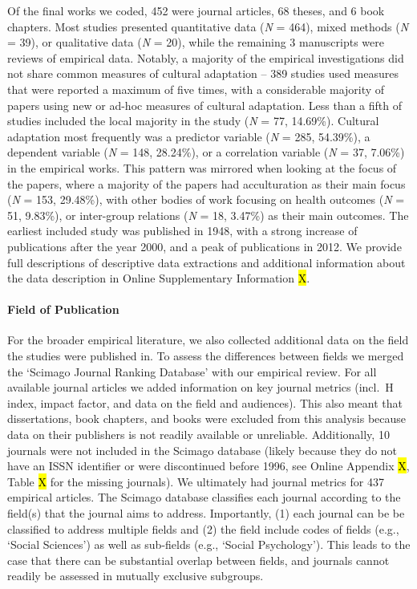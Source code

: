 

Of the final works we coded, 452 were journal articles, 68 theses, and 6
book chapters. Most studies presented quantitative data (\textit{N} =
464), mixed methods (\textit{N} = 39), or qualitative data (\textit{N} =
20), while the remaining 3 manuscripts were reviews of empirical data.
Notably, a majority of the empirical investigations did not share common
measures of cultural adaptation -- 389 studies used measures that were
reported a maximum of five times, with a considerable majority of papers
using new or ad-hoc measures of cultural adaptation. Less than a fifth
of studies included the local majority in the study (\textit{N} = 77,
14.69\%). Cultural adaptation most frequently was a predictor variable
(\textit{N} = 285, 54.39\%), a dependent variable (\textit{N} = 148,
28.24\%), or a correlation variable (\textit{N} = 37, 7.06\%) in the
empirical works. This pattern was mirrored when looking at the focus of
the papers, where a majority of the papers had acculturation as their
main focus (\textit{N} = 153, 29.48\%), with other bodies of work
focusing on health outcomes (\textit{N} = 51, 9.83\%), or inter-group
relations (\textit{N} = 18, 3.47\%) as their main outcomes. The earliest
included study was published in 1948, with a strong increase of
publications after the year 2000, and a peak of publications in 2012. We
provide full descriptions of descriptive data extractions and additional
information about the data description in Online Supplementary
Information \hl{X}.

\paragraph{Field of Publication}

For the broader empirical literature, we also collected additional data
on the field the studies were published in. To assess the differences
between fields we merged the `Scimago Journal Ranking Database'
\citep{SCImago2020} with our empirical review. For all available journal
articles we added information on key journal metrics (incl.~H index,
impact factor, and data on the field and audiences). This also meant
that dissertations, book chapters, and books were excluded from this
analysis because data on their publishers is not readily available or
unreliable. Additionally, 10 journals were not included in the Scimago
database (likely because they do not have an ISSN identifier or were
discontinued before 1996, see Online Appendix \hl{X}, Table \hl{X} for
the missing journals). We ultimately had journal metrics for 437
empirical articles. The Scimago database classifies each journal
according to the field(s) that the journal aims to address. Importantly,
(1) each journal can be be classified to address multiple fields and (2)
the field include codes of fields (e.g., `Social Sciences') as well as
sub-fields (e.g., `Social Psychology'). This leads to the case that
there can be substantial overlap between fields, and journals cannot
readily be assessed in mutually exclusive subgroups.

